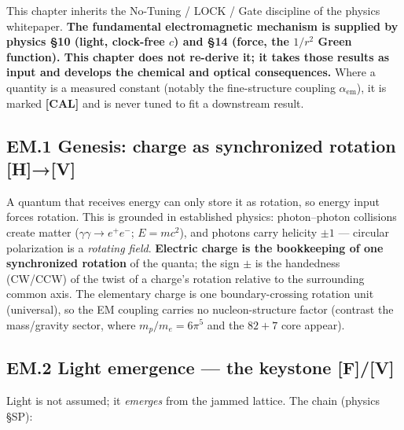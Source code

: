 \documentclass[
  10pt,
]{article}
\begin{document}
This chapter inherits the No-Tuning / LOCK / Gate discipline of the
physics whitepaper. \textbf{The fundamental electromagnetic mechanism is
supplied by physics §10 (light, clock-free \(c\)) and §14 (force, the
\(1/r^2\) Green function). This chapter does not re-derive it; it takes
those results as input and develops the chemical and optical
consequences.} Where a quantity is a measured constant (notably the
fine-structure coupling \(\alpha_{\mathrm{em}}\)), it is marked
\textbf{{[}CAL{]}} and is never tuned to fit a downstream result.

\hypertarget{em.1-genesis-charge-as-synchronized-rotation-hv}{%
\subsection{\texorpdfstring{EM.1 Genesis: charge as synchronized
rotation
\textbf{{[}H{]}→{[}V{]}}}{EM.1 Genesis: charge as synchronized rotation {[}H{]}→{[}V{]}}}\label{em.1-genesis-charge-as-synchronized-rotation-hv}}

A quantum that receives energy can only store it as rotation, so energy
input forces rotation. This is grounded in established physics:
photon--photon collisions create matter (\(\gamma\gamma \to e^+e^-\);
\(E=mc^2\)), and photons carry helicity \(\pm 1\) --- circular
polarization is a \emph{rotating field}. \textbf{Electric charge is the
bookkeeping of one synchronized rotation} of the quanta; the sign
\(\pm\) is the handedness (CW/CCW) of the twist of a charge's rotation
relative to the surrounding common axis. The elementary charge is one
boundary-crossing rotation unit (universal), so the EM coupling carries
no nucleon-structure factor (contrast the mass/gravity sector, where
\(m_p/m_e = 6\pi^5\) and the \(82{+}7\) core appear).

\hypertarget{em.2-light-emergence-the-keystone-fv}{%
\subsection{\texorpdfstring{EM.2 Light emergence --- the keystone
\textbf{{[}F{]}/{[}V{]}}}{EM.2 Light emergence --- the keystone {[}F{]}/{[}V{]}}}\label{em.2-light-emergence-the-keystone-fv}}

Light is not assumed; it \emph{emerges} from the jammed lattice. The
chain (physics §SP):
\end{document}
